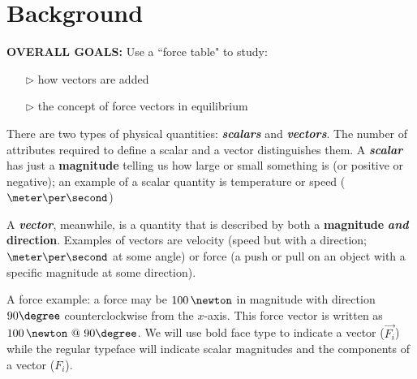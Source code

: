 
\label{lab:M1}

















\section{Background}

\textbf{OVERALL GOALS:}
Use a ``force table" to study:
\begin{enumerate}
\item[$\triangleright$] how vectors are added
\item[$\triangleright$] the concept of force vectors in equilibrium
\end{enumerate}


There are two types of physical quantities: \textbf{\textit{scalars}} and \textbf{\textit{vectors}}. The number of attributes required to define a scalar and a vector distinguishes them. A \textbf{\textit{scalar}} has just a \textbf{magnitude} telling us how large or small something is (or positive or negative); an example of a scalar quantity is temperature or speed ($\meter\per\second$)

A \textbf{\textit{vector}}, meanwhile, is a quantity that is described by both a \textbf{magnitude} \textbf{\textit{and}} \textbf{direction}. Examples of vectors are velocity (speed but with a direction; $\meter\per\second$ at some angle) or force (a push or pull on an object with a specific magnitude at some direction).

A force example: a force may be $100\,\newton$ in magnitude with direction $90\degree$ counterclockwise from the $x$-axis. This force vector is written as $100\,\newton \ @ \ 90\degree$. We will use bold face type to indicate a vector ($\vec{F_i}$) while the regular typeface will indicate scalar magnitudes and the components of a vector ($F_i$).

